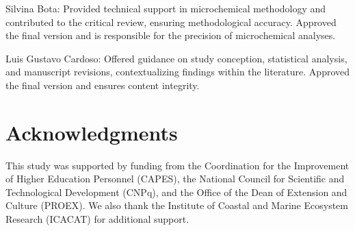 \documentclass[utf8]{FrontiersinHarvard}
\begin{document}
Silvina Bota: Provided technical support in microchemical methodology
and contributed to the critical review, ensuring methodological
accuracy. Approved the final version and is responsible for the
precision of microchemical analyses.

Luis Gustavo Cardoso: Offered guidance on study conception, statistical
analysis, and manuscript revisions, contextualizing findings within the
literature. Approved the final version and ensures content integrity.

\section*{Acknowledgments}\label{acknowledgments}

This study was supported by funding from the Coordination for the
Improvement of Higher Education Personnel (CAPES), the National Council
for Scientific and Technological Development (CNPq), and the Office of
the Dean of Extension and Culture (PROEX). We also thank the Institute
of Coastal and Marine Ecosystem Research (ICACAT) for additional
support.
\end{document}
